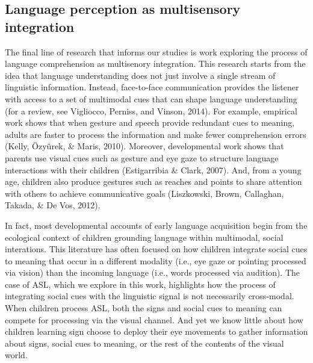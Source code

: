 \documentclass[english,floatsintext,man]{apa6}
\begin{document}
\hypertarget{language-perception-as-multisensory-integration}{%
\subsection{Language perception as multisensory
integration}\label{language-perception-as-multisensory-integration}}

The final line of research that informs our studies is work exploring
the process of language comprehension as multisenory integration. This
research starts from the idea that language understanding does not just
involve a single stream of linguistic information. Instead, face-to-face
communication provides the listener with access to a set of multimodal
cues that can shape language understanding (for a review, see Vigliocco,
Perniss, and Vinson, 2014). For example, empirical work shows that when
gesture and speech provide redundant cues to meaning, adults are faster
to process the information and make fewer comprehension errors (Kelly,
Özyürek, \& Maris, 2010). Moreover, developmental work shows that
parents use visual cues such as gesture and eye gaze to structure
language interactions with their children (Estigarribia \& Clark, 2007).
And, from a young age, children also produce gestures such as reaches
and points to share attention with others to achieve communicative goals
(Liszkowski, Brown, Callaghan, Takada, \& De Vos, 2012).

In fact, most developmental accounts of early language acquisition begin
from the ecological context of children grounding language within
multimodal, social interations. This literature has often focused on how
children integrate social cues to meaning that occur in a different
modality (i.e., eye gaze or pointing processed via vision) than the
incoming language (i.e., words processed via audition). The case of ASL,
which we explore in this work, highlights how the process of integrating
social cues with the linguistic signal is not necessarily cross-modal.
When children process ASL, both the signs and social cues to meaning can
compete for processing via the visual channel. And yet we know little
about how children learning sign choose to deploy their eye movements to
gather information about signs, social cues to meaning, or the rest of
the contents of the visual world.
\end{document}
